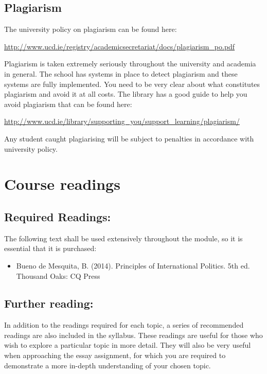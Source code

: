 \documentclass[12pt,a4paper]{article}
\begin{document}
\subsection*{Plagiarism}

The university policy on plagiarism can be found here:

\url{http://www.ucd.ie/registry/academicsecretariat/docs/plagiarism_po.pdf}

Plagiarism is taken extremely seriously throughout the university and academia in general. The school has systems in place to detect plagiarism and these systems are fully implemented. You need to be very clear about what constitutes plagiarism and avoid it at all costs. The library has a good guide to help you avoid plagiarism that can be found here:

\url{http://www.ucd.ie/library/supporting_you/support_learning/plagiarism/}

Any student caught plagiarising will be subject to penalties in accordance with university policy.

\section*{Course readings}

\subsection*{Required Readings:}

The following text shall be used extensively throughout the module, so it is essential that it is purchased:

\begin{itemize}
	\item Bueno de Mesquita, B. (2014). Principles of International Politics. 5th ed. Thousand Oaks: CQ Press
\end{itemize}

\subsection*{Further reading:}

In addition to the readings required for each topic, a series of recommended readings are also included in the syllabus. These readings are useful for those who wish to explore a particular topic in more detail. They will also be very useful when approaching the essay assignment, for which you are required to demonstrate a more in-depth understanding of your chosen topic. 
\end{document}
